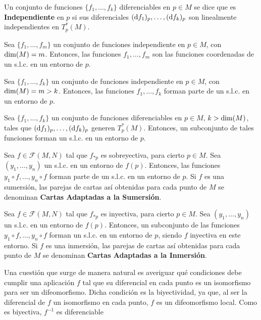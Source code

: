 \documentclass[Cursovd_portada.tex]{subfiles}
\begin{document}
\begin{defi}
Un conjunto de funciones $\{f_1,\dots ,f_k\}$ diferenciables en
$p\in M$ se dice que es {\bf Independiente} en $p$ si sus
diferenciales $({\rm d} f_1)_p,\dots, ({\rm d} f_k)_p$ son linealmente
independientes en $T_p^*(M)$.
\end{defi}
\begin{coro}
Sea $\{f_1,\dots ,f_m\}$ un conjunto de funciones independiente en
$p\in M$, con ${\rm dim}(M)=m$. Entonces, las funciones $f_1,\dots
,f_m$ son las funciones coordenadas de un s.l.c. en un entorno de
$p$.
\end{coro}
\begin{coro}
Sea $\{f_1,\dots ,f_k\}$ un conjunto de funciones independiente en
$p\in M$, con ${\rm dim}(M)=m>k$. Entonces, las funciones
$f_1,\dots ,f_k$ forman parte de un s.l.c. en un entorno de $p$.
\end{coro}
\begin{coro}
Sea $\{f_1,\dots ,f_k\}$ un conjunto de funciones diferenciables
en $p\in M$, $k>{\rm dim}(M)$, tales que $({\rm d} f_1)_p,\dots
,({\rm d} f_k)_p$ generen $T_p^*(M)$. Entonces, un subconjunto de
tales funciones forman un s.l.c. en un entorno de $p$.
\end{coro}
\begin{coro}
Sea $f\in\mathcal{F}(M,N)$ tal que $f_{*p}$ es sobreyectiva, para
cierto $p\in M$. Sea $(y_1,\dots ,y_n)$ un s.l.c. en un entorno de
$f(p)$. Entonces, las funciones \ $y_1\circ f,\dots ,y_n\circ f$
forman parte de un s.l.c. en un entorno de $p$. Si $f$ es una
sumersión, las parejas de cartas así obtenidas para cada
punto de $M$ se denominan {\bf Cartas Adaptadas a la
Sumersión}.
\end{coro}
\begin{coro}
Sea $f\in\mathcal{F}(M,N)$ tal que $f_{*p}$ es inyectiva, para
cierto $p\in M$. Sea $(y_1,\dots ,y_n)$ un s.l.c. en un entorno de
$f(p)$. Entonces, un subconjunto de las funciones $y_1\circ
f,\dots ,y_n\circ f$ forman un s.l.c. en un entorno de $p$, siendo
$f$ inyectiva en este entorno. Si $f$ es una inmersión, las
parejas de cartas así obtenidas para cada punto de $M$ se
denominan {\bf Cartas Adaptadas a la Inmersión}.
\end{coro}
Una cuestión que surge de manera natural es averiguar qué
condiciones debe cumplir una aplicación $f$ tal que su
diferencial en cada punto es un isomorfismo para ser un
difeomorfismo. Dicha condición es la biyectividad, ya que, al
ser la diferencial de $f$ un isomorfismo en cada punto, $f$ es un
difeomorfismo local. Como es biyectiva, $f^{-1}$ es diferenciable
\end{document}
